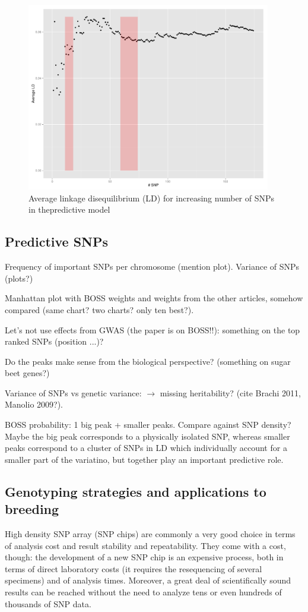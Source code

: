 \begin{figure}
\includegraphics[width=0.95\textwidth]{LD.pdf}
\caption{Average linkage disequilibrium (LD) for increasing number of
  SNPs in thepredictive model}
\label{fig:ld} 
\end{figure}

\subsection{Predictive SNPs}
Frequency of important SNPs per chromosome (mention plot).
Variance of SNPs (plots?)

Manhattan plot with BOSS weights and weights from the other articles,
somehow compared (same chart? two charts? only ten best?).

Let's not use effects from GWAS (the paper is on BOSS!!): something on
the top ranked SNPs (position ...)?

Do the peaks make sense from the biological perspective? (something on
sugar beet genes?)

Variance of SNPs vs genetic variance: $\rightarrow$ missing
heritability? (cite Brachi 2011, Manolio 2009?).

BOSS probability: 1 big peak + smaller peaks. Compare against SNP
density? Maybe the big peak corresponds to a physically isolated SNP,
whereas smaller peaks correspond to a cluster of SNPs in LD which
individually account for a smaller part of the variatino, but together
play an important predictive role. 


\subsection{Genotyping strategies and applications to breeding}
High density SNP array (SNP chips) are commonly a very good choice in
terms of analysis cost and result stability and repeatability. They come
with a cost, though: the development of a new SNP chip is an expensive
process, both in terms of direct laboratory costs (it requires the
resequencing of several specimens) and of analysis times. Moreover, a great deal
of scientifically sound results can be reached without the need to analyze
tens or even hundreds of thousands of SNP data.

